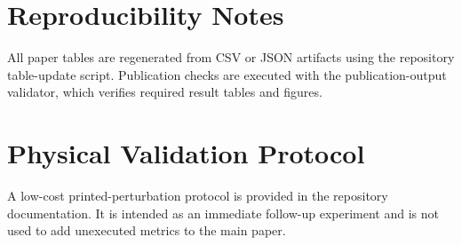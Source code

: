 \documentclass[11pt,a4paper]{article}
\begin{document}
\section{Reproducibility Notes}
All paper tables are regenerated from CSV or JSON artifacts using the repository table-update script. Publication checks are executed with the publication-output validator, which verifies required result tables and figures.

\section{Physical Validation Protocol}
A low-cost printed-perturbation protocol is provided in the repository documentation. It is intended as an immediate follow-up experiment and is not used to add unexecuted metrics to the main paper.
\end{document}
